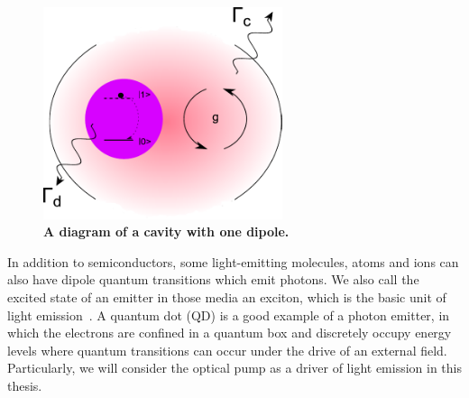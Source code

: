 \begin{figure}[htp]%
\centering
\begin{center}
\includegraphics[width=7cm]{./Figs/Cavity_withDipoleT}%
\end{center}
\caption[A diagram of a cavity with one dipole.]{\textbf{A diagram of a cavity with one dipole.} }
\label{Cavity_withDipoleT}
\end{figure}


In addition to semiconductors, some light-emitting molecules, atoms and ions can also have dipole quantum transitions which emit photons. We also call the excited state of an emitter in those media an exciton, which is the basic unit of light emission~\cite{Gibbs2011}. A quantum dot (QD) is a good example of a photon emitter, in which the electrons are confined in a quantum box and discretely occupy energy levels where quantum transitions can occur under the drive of an external field. Particularly, we will consider the optical pump as a driver of light emission in this thesis.

